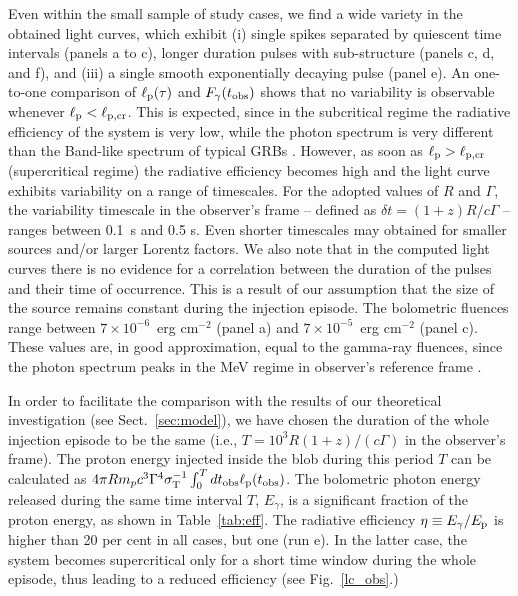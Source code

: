 \documentclass[fleqn,usenatbib]{mnras}
\newcommand{\lp}{\ell_{\rm p}}
\newcommand{\lpcr}{\ell_{\rm p,cr}}
\begin{document}
{Even within the small sample of study cases, we find a wide variety in the obtained light curves, which exhibit (i) single spikes separated by quiescent time intervals (panels a to c),  longer duration pulses with sub-structure (panels c, d, and f), and (iii) a single smooth exponentially decaying pulse (panel e). An one-to-one comparison of $\lp(\tau)$ and $F_{\gamma}(t_{\rm obs})$ shows that no variability is observable whenever $\lp < \lpcr$. This is expected, since in the subcritical regime the radiative efficiency of the system is very low, while the photon spectrum is very different than the Band-like spectrum of typical GRBs \citep[for details, see][]{pdmg14}. However, as soon as $\lp > \lpcr$ (supercritical regime) the radiative efficiency becomes high and the light curve exhibits variability on a range of timescales. For the adopted values of $R$ and $\Gamma$, the variability timescale in the observer's frame -- defined as $\delta t = (1+z) R/c\Gamma$ -- ranges between 0.1~s and 0.5 s. Even shorter timescales may obtained for smaller sources and/or larger Lorentz factors. We also note that in the computed light curves there is no evidence for a correlation between the duration of the pulses and their time of occurrence. This is a result of our assumption that the size of the source remains constant during the injection episode. The bolometric fluences range between $7\times10^{-6}$~erg cm$^{-2}$ (panel a) and $7\times10^{-5}$~erg cm$^{-2}$ (panel c). These values are,  in good approximation, equal to the gamma-ray fluences, since the photon spectrum peaks in the MeV regime in observer's reference frame \citep{pdmg14}. 
 
{In order to facilitate the comparison with the results of our theoretical investigation (see Sect.~\ref{sec:model}), we have chosen the duration of the whole injection episode to be the same (i.e., $T=10^3 R (1+z)/(c\Gamma)$ in the observer's frame).}
The proton energy injected inside the blob  during this period $T$ can be calculated as $4 \pi R m_p c^3 \Gamma^4 \sigma_{\rm T}^{-1} \int_{0}^{T} dt_{\rm obs} \ell_{\rm p}(t_{\rm obs})$. The bolometric photon energy released during the same time interval $T$, $E_{\gamma}$, is a significant fraction of the proton energy, as shown in Table~\ref{tab:eff}. The radiative efficiency $\eta \equiv E_{\gamma}/E_{\rm p}$ is higher than 20 per cent in all cases, but one (run e). In the latter case, the system becomes supercritical only for a short time window during the whole episode, thus leading to a reduced efficiency (see Fig.~\ref{lc_obs}.)

}
\end{document}
